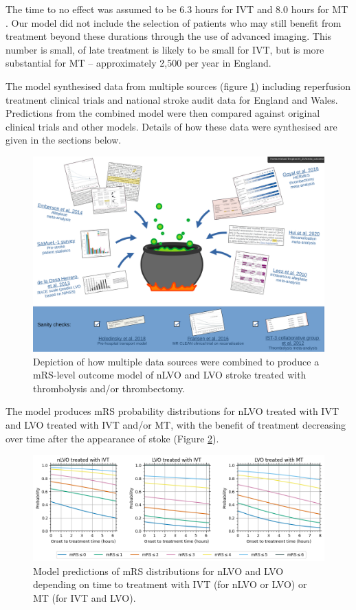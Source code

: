 The time to no effect was assumed to be 6.3 hours for IVT \cite{emberson_effect_2014} and 8.0 hours for MT \cite{fransen_time_2016}. Our model did not include the selection of patients who may still benefit from treatment beyond these durations through the use of advanced imaging. This number is small, of late treatment is likely to be small for IVT, but is more substantial for MT – approximately 2,500 per year in England. 

The model synthesised data from multiple sources (figure \ref{fig:data_cauldron}) including reperfusion treatment clinical trials and national stroke audit data for England and Wales. Predictions from the combined model were then compared against original clinical trials and other models. Details of how these data were synthesised are given in the sections below.

\begin{figure}[h!]
    \centering
    \includegraphics[width=1.0\linewidth]{images_modelling/data_cauldron.png}
    \caption{Depiction of how multiple data sources were combined to produce a mRS-level outcome model of nLVO and LVO stroke treated with thrombolysis and/or thrombectomy.}
    \label{fig:data_cauldron}
\end{figure}

The model produces mRS probability distributions for nLVO treated with IVT and LVO treated with IVT and/or MT, with the benefit of treatment decreasing over time after the appearance of stoke (Figure \ref{fig:probs_with_time}).

\begin{figure}[h!]
    \centering
    \includegraphics[width=1.0\linewidth]{images_modelling/probs_with_time.png}
    \caption{Model predictions of mRS distributions for nLVO and LVO depending on time to treatment with IVT (for nLVO or LVO) or MT (for IVT and LVO).}
    \label{fig:probs_with_time}
\end{figure}

